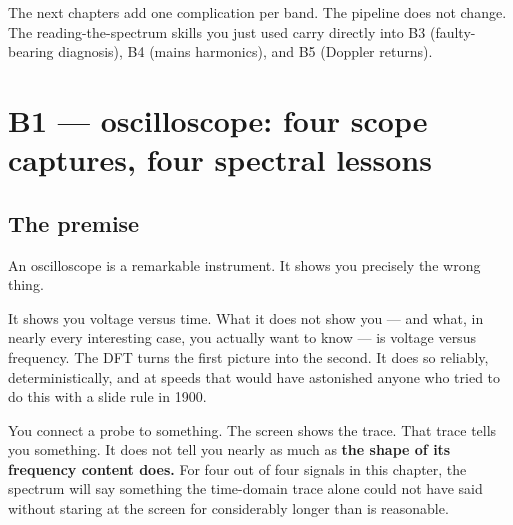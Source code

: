 \documentclass[11pt,a4paper,openany]{book}
\begin{document}
The next chapters add one complication per band. The pipeline does
not change. The reading-the-spectrum skills you just used carry
directly into B3 (faulty-bearing diagnosis), B4 (mains harmonics),
and B5 (Doppler returns).


\newcommand{\rebuildbanner}{%
\begin{tcolorbox}[colback=codebg,colframe=black!40,arc=2pt,
                  title={Rebuild status},fonttitle=\bfseries\small,
                  coltitle=black,colbacktitle=codebg!80!black!8]
This chapter is carried over from the v0.2.x-first-cut markdown
sources. It still operates on \emph{synthesised} data. Queued for the
same real-data pipeline rebuild as Chapter~\ref{ch:b0} (B0). The
engineering content below is intact and correct for the synthesised
case; the upgrade replaces only the data source and the three figures.
\end{tcolorbox}}

\chapter{B1 --- oscilloscope: four scope captures, four spectral lessons}
\label{ch:b1}

\section{The premise}

An oscilloscope is a remarkable instrument. It shows you precisely the
wrong thing.

It shows you voltage versus time. What it does not show you --- and
what, in nearly every interesting case, you actually want to know ---
is voltage versus frequency. The DFT turns the first picture into the
second. It does so reliably, deterministically, and at speeds that
would have astonished anyone who tried to do this with a slide rule in
1900.

You connect a probe to something. The screen shows the trace. That
trace tells you something. It does not tell you nearly as much as
\textbf{the shape of its frequency content does.} For four out of
four signals in this chapter, the spectrum will say something the
time-domain trace alone could not have said without staring at the
screen for considerably longer than is reasonable.
\end{document}
